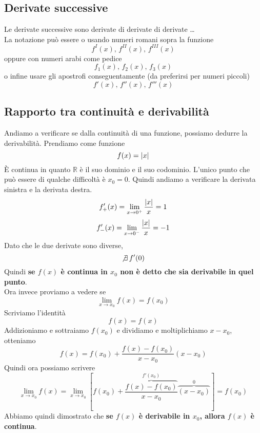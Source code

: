 \subsection{Derivate successive}
Le derivate successive sono derivate di derivate di derivate \ldots\\
La notazione può essere o usando numeri romani sopra la funzione
\begin{equation*}
  f^I(x),\,f^{II}(x),\,f^{III}(x)
\end{equation*}
oppure con numeri arabi come pedice
\begin{equation*}
  f_1(x),\,f_2(x),\,f_3(x)
\end{equation*}
o infine usare gli apostrofi conseguentamente (da preferirsi per numeri piccoli)
\begin{equation*}
  f'(x),\,f''(x),\,f'''(x)
\end{equation*}

\subsection{Rapporto tra continuità e derivabilità}
Andiamo a verificare se dalla continuità di una funzione, possiamo dedurre la derivabilità.
Prendiamo come funzione
\begin{equation*}
  f(x) = \lvert x\rvert
\end{equation*}
È continua in quanto $\mathbb{R}$ è il suo dominio e il suo codominio. L'unico punto che può
essere di qualche difficoltà è $x_0=0$. Quindi andiamo a verificare la derivata sinistra 
e la derivata destra.
\begin{equation*}
  f_+'(x) = \lim\limits_{x\to0^+} \frac{\lvert x\rvert}{x} = 1
\end{equation*}
\begin{equation*}
  f_-'(x) = \lim\limits_{x\to0^-} \frac{\lvert x\rvert}{x} = -1 
\end{equation*}
Dato che le due derivate sono diverse,
\begin{equation*}
  \not\exists\,f'(0)
\end{equation*}
Quindi \textbf{se $f(x)$ è continua in $x_0$ non è detto che sia derivabile in quel punto}.\\
[\baselineskip]
Ora invece proviamo a vedere se
\begin{equation*}
  \lim\limits_{x\to x_0}f(x) = f(x_0)
\end{equation*}
Scriviamo l'identità
\begin{equation*}
  f(x) = f(x)
\end{equation*}
Addizioniamo e sottraiamo $f(x_0)$ e dividiamo e moltiplichiamo $x-x_0$, otteniamo
\begin{equation*}
  f(x) = f(x_0)+\frac{f(x)-f(x_0)}{x-x_0}(x-x_0)
\end{equation*}
Quindi ora possiamo scrivere
\begin{equation*}
  \lim\limits_{x\to x_0} f(x)=
  \lim\limits_{x\to x_0}\left[ f(x_0)+\overbrace{\frac{f(x)-f(x_0)}{x-x_0}}^{f'(x_0)}
  \overbrace{(x-x_0)}^{0}\right] = f(x_0)
\end{equation*}
Abbiamo quindi dimostrato che \textbf{se $f(x)$ è derivabile in $x_0$, allora $f(x)$ è continua}. 


